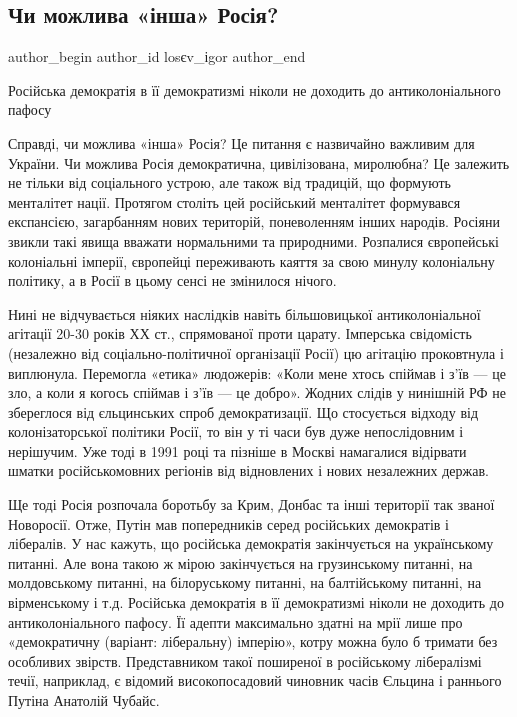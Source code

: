  
 
 
 
 
\subsection{Чи можлива «інша» Росія?}
\label{sec:13_01_2022.stz.news.ua.den.1.insha_rossia}

\ifcmt
 author_begin
   author_id losєv_іgor
 author_end
\fi

\begin{zznagolos}
Російська демократія в її демократизмі ніколи не доходить до антиколоніального пафосу	
\end{zznagolos}

Справді, чи можлива «інша» Росія? Це питання є назвичайно важливим для України.
Чи можлива Росія демократична, цивілізована, миролюбна? Це залежить не тільки
від соціального устрою, але також від традицій, що формують менталітет нації.
Протягом століть цей російський менталітет формувався експансією, загарбанням
нових територій, поневоленням інших народів. Росіяни звикли такі явища вважати
нормальними та природними. Розпалися європейські колоніальні імперії, європейці
переживають каяття за свою минулу колоніальну політику, а в Росії в цьому сенсі
не змінилося нічого.

Нині не відчувається ніяких наслідків навіть більшовицької антиколоніальної
агітації 20-30 років ХХ ст., спрямованої проти царату. Імперська свідомість
(незалежно від соціально-політичної організації Росії) цю агітацію проковтнула
і виплюнула. Перемогла «етика» людожерів: «Коли мене хтось спіймав і з’їв — це
зло, а коли я когось спіймав і з’їв — це добро». Жодних слідів у нинішній РФ не
збереглося від єльцинських спроб демократизації. Що стосується відходу від
колонізаторської політики Росії, то він у ті часи був дуже непослідовним і
нерішучим. Уже тоді в 1991 році та пізніше в Москві намагалися відірвати шматки
російськомовних регіонів від відновлених і нових незалежних держав.

Ще тоді Росія розпочала боротьбу за Крим, Донбас та інші території так званої
Новоросії. Отже, Путін мав попередників серед російських демократів і
лібералів. У нас кажуть, що російська демократія закінчується на українському
питанні. Але вона такою ж мірою закінчується на грузинському питанні, на
молдовському питанні, на білоруському питанні, на балтійському питанні, на
вірменському і т.д. Російська демократія в її демократизмі ніколи не доходить
до антиколоніального пафосу. Її адепти максимально здатні на мрії лише про
«демократичну (варіант: ліберальну) імперію», котру можна було б тримати без
особливих звірств. Представником такої поширеної в російському лібералізмі
течії, наприклад, є відомий високопосадовий чиновник часів Єльцина і раннього
Путіна Анатолій Чубайс.

